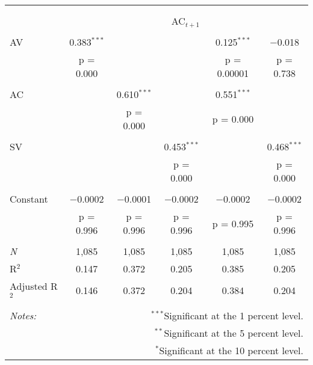 
\begin{tabular}{@{\extracolsep{5pt}}lccccc} 
\\[-1.8ex]\hline 
\hline \\[-1.8ex] 
\\[-1.8ex] & \multicolumn{5}{c}{AC$_{t+1}$} \\ 
\hline \\[-1.8ex] 
 AV & 0.383$^{***}$ &  &  & 0.125$^{***}$ & $-$0.018 \\ 
  & p = 0.000 &  &  & p = 0.00001 & p = 0.738 \\ 
  & & & & & \\ 
 AC &  & 0.610$^{***}$ &  & 0.551$^{***}$ &  \\ 
  &  & p = 0.000 &  & p = 0.000 &  \\ 
  & & & & & \\ 
 SV &  &  & 0.453$^{***}$ &  & 0.468$^{***}$ \\ 
  &  &  & p = 0.000 &  & p = 0.000 \\ 
  & & & & & \\ 
 Constant & $-$0.0002 & $-$0.0001 & $-$0.0002 & $-$0.0002 & $-$0.0002 \\ 
  & p = 0.996 & p = 0.996 & p = 0.996 & p = 0.995 & p = 0.996 \\ 
  & & & & & \\ 
\textit{N} & 1,085 & 1,085 & 1,085 & 1,085 & 1,085 \\ 
R$^{2}$ & 0.147 & 0.372 & 0.205 & 0.385 & 0.205 \\ 
Adjusted R$^{2}$ & 0.146 & 0.372 & 0.204 & 0.384 & 0.204 \\ 
\hline 
\hline \\[-1.8ex] 
\textit{Notes:} & \multicolumn{5}{r}{$^{***}$Significant at the 1 percent level.} \\ 
 & \multicolumn{5}{r}{$^{**}$Significant at the 5 percent level.} \\ 
 & \multicolumn{5}{r}{$^{*}$Significant at the 10 percent level.} \\ 
\end{tabular} 
